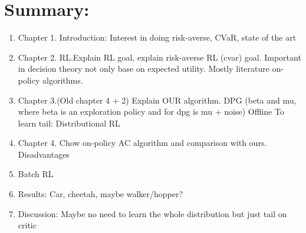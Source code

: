 \section{Summary:}
\begin{enumerate}
    \item Chapter 1. Introduction: Interest in doing risk-averse, CVaR, state of the art
    \item Chapter 2. RL.Explain RL goal, explain risk-averse RL (cvar) goal. Important in decision theory not only base on expected utility.
         Mostly literature on-policy algorithms.
    \item Chapter 3.(Old chapter 4 + 2) Explain OUR algorithm. 
            DPG (beta and mu, where beta is an exploration policy and for dpg is mu + noise)
            Offline
            To learn tail: Distributional RL
    \item Chapter 4. Chow on-policy AC algorithm and comparison with ours. Disadvantages
    \item Batch RL
    \item Results: Car, cheetah, maybe walker/hopper?
    \item Discussion: Maybe no need to learn the whole distribution but just tail on critic
\end{enumerate}